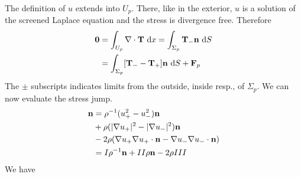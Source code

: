 \documentclass[preprint,11pt]{article}
\begin{document}
The definition of $u$ extends into $U_p.$ There, like in the exterior, $u$ is a solution of the screened Laplace
equation and the stress is divergence free. Therefore
\begin{align*}
{\bf 0} 
&= \int_{U_p} \nabla \cdot  {\bf T} \,\dif x
= \int_{\Sigma_p} {\bf T}_- {\bf n} \, \dif S\\
&= \int_{\Sigma_p} [{\bf T}_-  - {\bf T}_+ ]{\bf n} \, \dif S + {\bf F}_p
\end{align*}
The $\pm$ subscripts indicates limits from the outside, inside resp., of $\Sigma_p$.
We can now evaluate the stress jump.
\begin{align*}
[{\bf T}_+  - {\bf T}_- ]{\bf n}
&= \rho^{-1}(u_+^2 - u_-^2){\bf n}\\
&+ \rho  (|\nabla u_+|^2 - |\nabla u_-|^2 ){\bf n}\\
& - 2 \rho ( \nabla u_+ \nabla u_+ \cdot {\bf n} - \nabla u_- \nabla u_- \cdot {\bf n} )\\ 
&= I\rho^{-1}{\bf n} + II\rho{\bf n} -2\rho III
\end{align*}
We have
\end{document}
